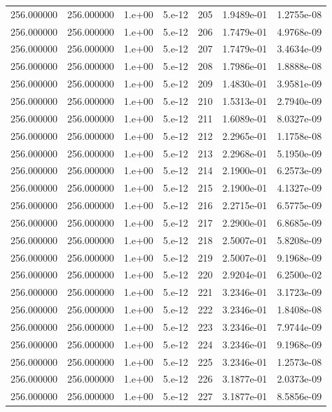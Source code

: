 \begin{table}[htbp]
\begin{tabular}{rrrrrrr}
256.000000 & 256.000000 & 1.e+00 & 5.e-12 & 205 & 1.9489e-01 & 1.2755e-08 \\
256.000000 & 256.000000 & 1.e+00 & 5.e-12 & 206 & 1.7479e-01 & 4.9768e-09 \\
256.000000 & 256.000000 & 1.e+00 & 5.e-12 & 207 & 1.7479e-01 & 3.4634e-09 \\
256.000000 & 256.000000 & 1.e+00 & 5.e-12 & 208 & 1.7986e-01 & 1.8888e-08 \\
256.000000 & 256.000000 & 1.e+00 & 5.e-12 & 209 & 1.4830e-01 & 3.9581e-09 \\
256.000000 & 256.000000 & 1.e+00 & 5.e-12 & 210 & 1.5313e-01 & 2.7940e-09 \\
256.000000 & 256.000000 & 1.e+00 & 5.e-12 & 211 & 1.6089e-01 & 8.0327e-09 \\
256.000000 & 256.000000 & 1.e+00 & 5.e-12 & 212 & 2.2965e-01 & 1.1758e-08 \\
256.000000 & 256.000000 & 1.e+00 & 5.e-12 & 213 & 2.2968e-01 & 5.1950e-09 \\
256.000000 & 256.000000 & 1.e+00 & 5.e-12 & 214 & 2.1900e-01 & 6.2573e-09 \\
256.000000 & 256.000000 & 1.e+00 & 5.e-12 & 215 & 2.1900e-01 & 4.1327e-09 \\
256.000000 & 256.000000 & 1.e+00 & 5.e-12 & 216 & 2.2715e-01 & 6.5775e-09 \\
256.000000 & 256.000000 & 1.e+00 & 5.e-12 & 217 & 2.2900e-01 & 6.8685e-09 \\
256.000000 & 256.000000 & 1.e+00 & 5.e-12 & 218 & 2.5007e-01 & 5.8208e-09 \\
256.000000 & 256.000000 & 1.e+00 & 5.e-12 & 219 & 2.5007e-01 & 9.1968e-09 \\
256.000000 & 256.000000 & 1.e+00 & 5.e-12 & 220 & 2.9204e-01 & 6.2500e-02 \\
256.000000 & 256.000000 & 1.e+00 & 5.e-12 & 221 & 3.2346e-01 & 3.1723e-09 \\
256.000000 & 256.000000 & 1.e+00 & 5.e-12 & 222 & 3.2346e-01 & 1.8408e-08 \\
256.000000 & 256.000000 & 1.e+00 & 5.e-12 & 223 & 3.2346e-01 & 7.9744e-09 \\
256.000000 & 256.000000 & 1.e+00 & 5.e-12 & 224 & 3.2346e-01 & 9.1968e-09 \\
256.000000 & 256.000000 & 1.e+00 & 5.e-12 & 225 & 3.2346e-01 & 1.2573e-08 \\
256.000000 & 256.000000 & 1.e+00 & 5.e-12 & 226 & 3.1877e-01 & 2.0373e-09 \\
256.000000 & 256.000000 & 1.e+00 & 5.e-12 & 227 & 3.1877e-01 & 8.5856e-09 \\

\end{tabular}
\end{table}
